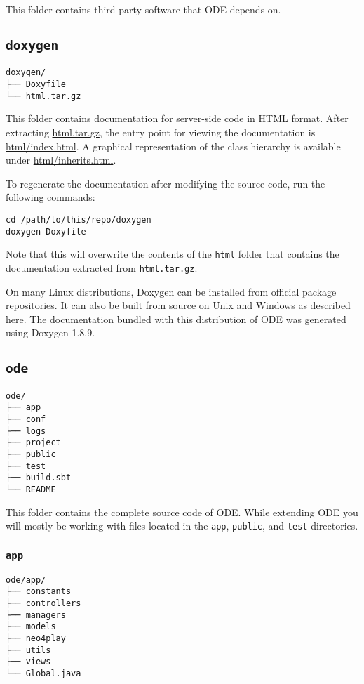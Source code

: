 \documentclass[11pt]{article}
\begin{document}
This folder contains third-party software that ODE depends on.

\subsection{\texttt{doxygen}}
\label{sec-3-2}
\begin{verbatim}
doxygen/
├── Doxyfile
└── html.tar.gz
\end{verbatim}

This folder contains documentation for server-side code in HTML
format. After extracting \href{doxygen/html.tar.gz}{html.tar.gz}, the entry point for viewing
the documentation is \href{doxygen/html/index.html}{html/index.html}. A graphical representation of
the class hierarchy is available under \href{doxygen/html/inherits.html}{html/inherits.html}.

To regenerate the documentation after modifying the source code,
run the following commands:

\begin{verbatim}
cd /path/to/this/repo/doxygen
doxygen Doxyfile
\end{verbatim}

Note that this will overwrite the contents of the \texttt{html} folder
that contains the documentation extracted from \texttt{html.tar.gz}.

On many Linux distributions, Doxygen can be installed from
official package repositories. It can also be built from source on
Unix and Windows as described \href{http://www.stack.nl/~dimitri/doxygen/manual/install.html}{here}. The documentation bundled with
this distribution of ODE was generated using Doxygen 1.8.9.

\subsection{\texttt{ode}}
\label{sec-3-3}
\begin{verbatim}
ode/
├── app
├── conf
├── logs
├── project
├── public
├── test
├── build.sbt
└── README
\end{verbatim}

This folder contains the complete source code of ODE. While
extending ODE you will mostly be working with files located in the
\texttt{app}, \texttt{public}, and \texttt{test} directories.

\subsubsection{\texttt{app}}
\label{sec-3-3-1}
\begin{verbatim}
ode/app/
├── constants
├── controllers
├── managers
├── models
├── neo4play
├── utils
├── views
└── Global.java
\end{verbatim}
\end{document}
